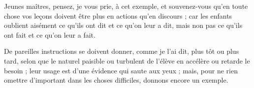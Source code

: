 
	{Jeunes maîtres, pensez, je vous prie, à cet exemple, et souvenez-vous qu’en toute chose vos leçons doivent être plus en actions qu’en discours ; car les enfants oublient aisément ce qu’ils ont dit et ce qu’on leur a dit, mais non pas ce qu’ils ont fait et ce qu’on leur a fait.
	
De pareilles instructions se doivent donner, comme je l’ai dit, plus tôt ou plus tard, selon que le naturel paisible ou turbulent de l’élève en accélère ou retarde le besoin ; leur usage est d’une évidence qui saute aux yeux ; mais, pour ne rien omettre d’important dans les choses difficiles, donnons encore un exemple.

}
